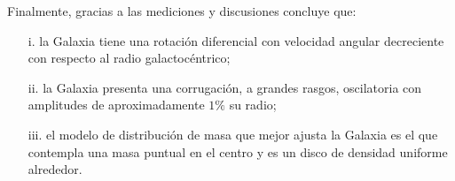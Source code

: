 Finalmente, gracias a las mediciones y discusiones concluye que:
\begin{enumerate}
\item[i.] la Galaxia tiene una rotación diferencial con velocidad angular decreciente con respecto al radio galactocéntrico;

\item[ii.] la Galaxia presenta una corrugación, a grandes rasgos, oscilatoria con amplitudes de aproximadamente $1\%$ su radio;

\item[iii.] el modelo de distribución de masa que mejor ajusta la Galaxia es el que contempla una masa puntual en el centro y es un disco de densidad uniforme alrededor. 
\end{enumerate}
